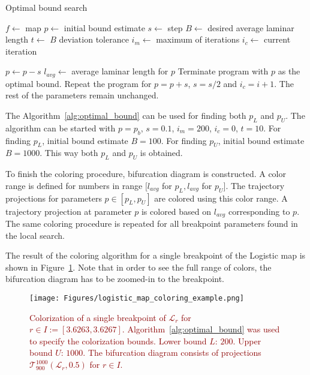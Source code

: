\begin{algorithm}[!h]
    \caption{Optimal bound search}
    \label{alg:optimal_bound}
    \begin{algorithmic}[1]
        \Statex $f \gets$ map
        \Statex $p \gets$ initial bound estimate
        \Statex $s \gets$ step
        \Statex $B \gets$ desired average laminar length
        \Statex $t \gets$ $B$ deviation tolerance
        \Statex $i_{m} \gets$ maximum of iterations
        \Statex $i_{c} \gets$ current iteration

            \State $p \gets p - s$
            \State $l_{avg} \gets$ average laminar length for $p$
                \State Terminate program with $p$ as the optimal bound.
            \EndIf
                \State Repeat the program for $p = p+s$, $s = s/2$ and $i_{c} = i+1$. The rest of the parameters remain unchanged.
            \EndIf
        \EndFor
    \end{algorithmic}
\end{algorithm}

The Algorithm~\ref{alg:optimal_bound} can be used for finding both $p_L$ and $p_U$.
The algorithm can be started with $p = p_b$, $s = 0.1$, $i_{m} = 200$, $i_{c} = 0$, $t = 10$.
For finding $p_L$, initial bound estimate $B = 100$.
For finding $p_U$, initial bound estimate $B = 1000$.
This way both $p_L$ and $p_U$ is obtained.
\par
To finish the coloring procedure, bifurcation diagram is constructed.
A color range is defined for numbers in range $[ l_{avg}$ for $p_L, l_{avg}$ for $p_U ]$.
The trajectory projections for parameters $p \in [ p_L, p_U ]$ are colored using this color range.
A trajectory projection at parameter $p$ is colored based on $l_{avg}$ corresponding to $p$.
The same coloring procedure is repeated for all breakpoint parameters found in the local search.
\par
The result of the coloring algorithm for a single breakpoint of the Logistic map is shown in Figure~\ref{fig:coloring_example}.
Note that in order to see the full range of colors, the bifurcation diagram has to be zoomed-in to the breakpoint.

\begin{figure}[!h]
    \centering
    \texttt{[image: Figures/logistic\_map\_coloring\_example.png]}
    \caption{
        \textcolor{darkred}{
        Colorization of a single breakpoint of $\mathcal{L}_{r}$ for $r \in I := [ 3.6263, 3.6267 ]$.
        Algorithm~\ref{alg:optimal_bound} was used to specify the colorization bounds.
        Lower bound $L$: $200$.
        Upper bound $U$: $1000$.
        The bifurcation diagram consists of projections $\mathcal{T}_{900}^{1000}(\mathcal{L}_{r}, 0.5)$ for $r \in I$.
        }
    }
    \label{fig:coloring_example}
\end{figure}

